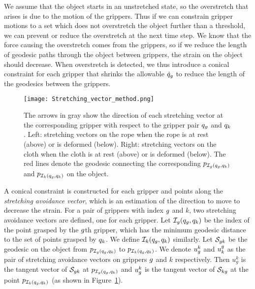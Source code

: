 We assume that the object starts in an unstretched state, so the overstretch that arises is due to the motion of the grippers. Thus if we can constrain gripper motions to a set which does not overstretch the object further than a threshold, we can prevent or reduce the overstretch at the next time step. We know that the force causing the overstretch comes from the grippers, so if we reduce the length of geodesic paths through the object between grippers, the strain on the object should decrease. When overstretch is detected, we thus introduce a conical constraint for each gripper that shrinks the allowable $\dot{q}_g$ to reduce the length of the geodesics between the grippers. 

\begin{figure}[ht]
    \centering
    \texttt{[image: Stretching\_vector\_method.png]}
    \caption{The arrows in gray show the direction of each stretching vector at the corresponding gripper with respect to the gripper pair $q_g$ and $q_k$. Left: stretching vectors on the rope when the rope is at rest (above) or is deformed (below). Right: stretching vectors on the cloth when the cloth is at rest (above) or is deformed (below). The red lines denote the geodesic connecting the corresponding $p_{\mathcal{I}_g(q_g, q_k)}$ and $p_{\mathcal{I}_k(q_g, q_k)}$ on the object.}
    \label{Fig:stretching_avoidance_vector_method}
\end{figure}

A conical constraint is constructed for each gripper and points along the \textit{stretching avoidance vector}, which is an estimation of the direction to move to decrease the strain. For a pair of grippers with index $g$ and $k$, two stretching avoidance vectors are defined, one for each gripper. Let $\mathcal{I}_g(q_g, q_k)$ be the index of the point grasped by the $g$th gripper, which has the minimum geodesic distance to the set of points grasped by $q_k$. We define $\mathcal{I}_k(q_g, q_k)$ similarly.  Let $\mathcal{S}_{g k}$ be the geodesic on the object from $p_{\mathcal{I}_g(q_g, q_k)}$ to $p_{\mathcal{I}_k(q_g, q_k)}$. We denote $u_g^k$ and $u_k^g$ as the pair of stretching avoidance vectors on grippers $g$ and $k$ respectively.  Then $u^k_g$ is the tangent vector of $\mathcal{S}_{g k}$ at $p_{\mathcal{I}_g(q_g, q_k)}$ and $u_g^k$ is the tangent vector of $\mathcal{S}_{k g}$ at the point $p_{\mathcal{I}_k(q_g, q_k)}$ (as shown in Figure~\ref{Fig:stretching_avoidance_vector_method}). 


